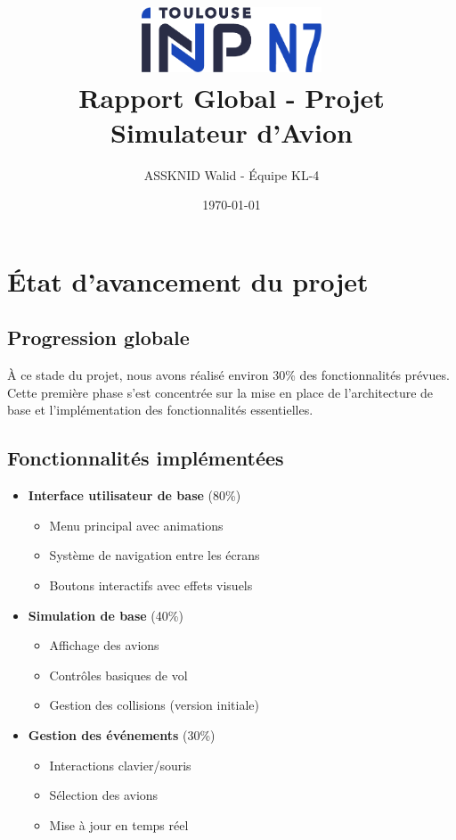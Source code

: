 \documentclass[12pt,a4paper]{article}
\title{
    \includegraphics[width=0.4\textwidth]{n7.png}\\[1cm]
    \textbf{Rapport Global - Projet Simulateur d'Avion}
}
\author{ASSKNID Walid - Équipe KL-4}
\date{\today}
\begin{document}
\maketitle
\thispagestyle{empty}

\tableofcontents
\newpage

\section{État d'avancement du projet}

\subsection{Progression globale}
À ce stade du projet, nous avons réalisé environ 30\% des fonctionnalités prévues. Cette première phase s'est concentrée sur la mise en place de l'architecture de base et l'implémentation des fonctionnalités essentielles.

\subsection{Fonctionnalités implémentées}
\begin{itemize}
    \item \textbf{Interface utilisateur de base} (80\%)
    \begin{itemize}
        \item Menu principal avec animations
        \item Système de navigation entre les écrans
        \item Boutons interactifs avec effets visuels
    \end{itemize}
    
    \item \textbf{Simulation de base} (40\%)
    \begin{itemize}
        \item Affichage des avions
        \item Contrôles basiques de vol
        \item Gestion des collisions (version initiale)
    \end{itemize}
    
    \item \textbf{Gestion des événements} (30\%)
    \begin{itemize}
        \item Interactions clavier/souris
        \item Sélection des avions
        \item Mise à jour en temps réel
    \end{itemize}
\end{itemize}
\end{document}
